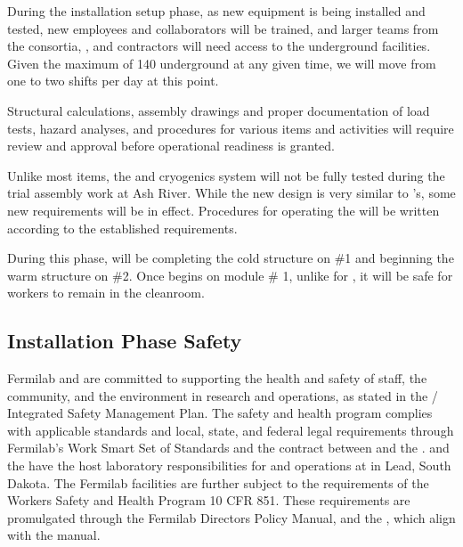 
During the installation setup phase, as new equipment is being installed and tested, new employees and collaborators will be trained, and larger teams from the consortia, ,  and contractors will need access to the underground facilities.  Given the maximum of 140  underground at any given time, we will move from one to two shifts per day at this point. 

Structural calculations, assembly drawings and proper documentation of  load tests, hazard analyses, and procedures for various items and activities will require review and approval before operational readiness is granted. 

Unlike most items, the \coldbox and cryogenics system will not be fully tested during the trial assembly work at Ash River. 
While the new \coldbox design is very similar to 's, some new requirements will be in effect.   Procedures for operating the \coldbox will be written according to the established requirements.

During this phase,  will be completing the cold structure on  \#1 and beginning the warm structure on   \#2. Once \cooldown begins on module \# 1, unlike for , it will be safe for workers to remain in the cleanroom.  

  

\subsection{Installation Phase Safety}
\label{sec:fdsp-tc-inst-safety}

Fermilab and  are committed to supporting the health and safety of staff, the community, and the environment in research and operations, as stated in the / Integrated Safety Management Plan\cite{bib:docdb291}. The safety and health program complies with applicable standards and local, state, and federal legal requirements through Fermilab's Work Smart Set of Standards  and the contract between  and the .  and the  have the host laboratory responsibilities for  and  operations at  in Lead, South Dakota.
The Fermilab facilities are further subject to the requirements of the  Workers Safety and Health Program 10 CFR 851\cite{doe-10cfr851}. These requirements are promulgated through the Fermilab Directors Policy Manual, and the , which align with the   manual.

